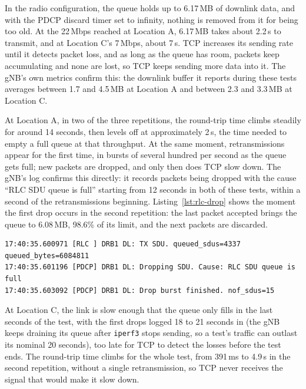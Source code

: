 In the radio configuration, the queue holds up to 6.17\,MB of downlink data, and with the \gls{PDCP} discard timer set to infinity, nothing is removed from it for being too old. At the 22\,Mbps reached at Location A, 6.17\,MB takes about 2.2\,s to transmit, and at Location C's 7\,Mbps, about 7\,s. TCP increases its sending rate until it detects packet loss, and as long as the queue has room, packets keep accumulating and none are lost, so TCP keeps sending more data into it. The \gls{gNB}'s own metrics confirm this: the downlink buffer it reports during these tests averages between 1.7 and 4.5\,MB at Location A and between 2.3 and 3.3\,MB at Location C.

At Location A, in two of the three repetitions, the round-trip time climbs steadily for around 14 seconds, then levels off at approximately 2\,s, the time needed to empty a full queue at that throughput. At the same moment, retransmissions appear for the first time, in bursts of several hundred per second as the queue gets full; new packets are dropped, and only then does TCP slow down. The \gls{gNB}'s log confirms this directly: it records packets being dropped with the cause ``\gls{RLC} SDU queue is full'' starting from 12 seconds in both of these tests, within a second of the retransmissions beginning. Listing~\ref{lst:rlc-drop} shows the moment the first drop occurs in the second repetition: the last packet accepted brings the queue to 6.08\,MB, 98.6\% of its limit, and the next packets are discarded.

\begin{lstlisting}[backgroundcolor=\color{gray!20},frame=single,framerule=0.8pt,rulecolor=\color{black},basicstyle=\ttfamily\small,columns=fixed,keepspaces=true,caption={First queue-full drop in \texttt{gnb.log} during the second Location A TCP downlink test in Round~3, 13.6 seconds into the test, shortened to the relevant fields.},label={lst:rlc-drop}]
17:40:35.600971 [RLC ] DRB1 DL: TX SDU. queued_sdus=4337 queued_bytes=6084811
17:40:35.601196 [PDCP] DRB1 DL: Dropping SDU. Cause: RLC SDU queue is full
17:40:35.603092 [PDCP] DRB1 DL: Drop burst finished. nof_sdus=15
\end{lstlisting}

At Location C, the link is slow enough that the queue only fills in the last seconds of the test, with the first drops logged 18 to 21 seconds in (the \gls{gNB} keeps draining its queue after \texttt{iperf3} stops sending, so a test's traffic can outlast its nominal 20 seconds), too late for TCP to detect the losses before the test ends. The round-trip time climbs for the whole test, from 391\,ms to 4.9\,s in the second repetition, without a single retransmission, so TCP never receives the signal that would make it slow down.


